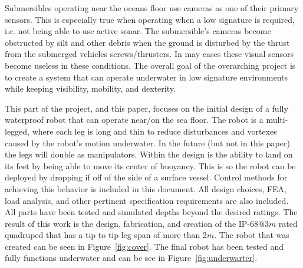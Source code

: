 Submersibles operating near the oceans floor use cameras as one of their primary sensors.
This is especially true when operating when a low signature is required, i.e. not being able to use active sonar.
The submersible's cameras become obstructed by silt and other debris when the ground is disturbed by the thrust from the submerged vehicles screws/thrusters.
In may cases these visual sensors become useless in these conditions.
The overall goal of the overarching project is to create a system that can operate underwater in low signature environments while keeping visibility, mobility, and dexterity. 

This part of the project, and this paper, focuses on the initial design of a fully waterproof robot that can operate near/on the sea floor.
The robot is a multi-legged, where each leg is long and thin to reduce disturbances and vortexes caused by the robot's motion underwater.
In the future (but not in this paper) the legs will double as manipulators.
Within the design is the ability to land on its feet by being able to move its center of buoyancy.
This is so the robot can be deployed by dropping if off of the side of a surface vessel.
Control methods for achieving this behavior is included in this document.
All design choices, FEA, load analysis, and other pertinent specification requirements are also included.
All parts have been tested and simulated depths beyond the desired ratings.
The result of this work is the design, fabrication, and creation of the IP-68@3$m$ rated quadruped that has a tip to tip leg span of more than 2$m$.
The robot that was created can be seen in Figure~\ref{fig:cover}.
The final robot has been tested and fully functions underwater and can be see in Figure~\ref{fig:underwarter}.



